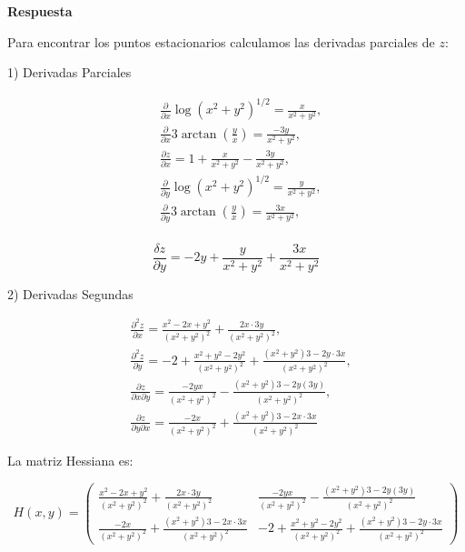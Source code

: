 \documentclass{report}
\begin{document}
\textbf{Respuesta}

Para encontrar los puntos estacionarios calculamos las derivadas parciales de $z$:

1) Derivadas Parciales

\[
\begin{aligned}
& \frac{\partial}{\partial x} \log \left(x^{2}+y^{2}\right)^{1 / 2}=\frac{x}{x^{2}+y^{2}}, \\
& \frac{\partial}{\partial x} 3\arctan\left(\frac{y}{x}\right)=\frac{-3 y}{x^{2}+y^{2}}, \\
& \frac{\partial z}{\partial x}=1+\frac{x}{x^{2}+y^{2}}-\frac{3 y}{x^{2}+y^{2}}, \\
& \frac{\partial}{\partial y} \log \left(x^{2}+y^{2}\right)^{1 / 2}=\frac{y}{x^{2}+y^{2}}, \\
& \frac{\partial}{\partial y} 3\arctan\left(\frac{y}{x}\right)=\frac{3 x}{x^{2}+y^{2}}, \\
\end{aligned}
\]

\[
\frac{\delta z}{\partial y}=-2 y+\frac{y}{x^{2}+y^{2}}+\frac{3 x}{x^{2}+y^{2}}
\]

2) Derivadas Segundas

\[
\begin{aligned}
& \frac{\partial^{2} z}{\partial x}=\frac{x^{2}-2 x+y^{2}}{\left(x^{2}+y^{2}\right)^{2}}+\frac{2 x \cdot 3 y}{\left(x^{2}+y^{2}\right)^{2}}, \\
& \frac{\partial^{2} z}{\partial y}=-2+\frac{x^{2}+y^{2}-2 y^{2}}{\left(x^{2}+y^{2}\right)^{2}}+\frac{(x^{2}+y^{2})3-2 y \cdot 3 x}{\left(x^{2}+y^{2}\right)^{2}}, \\
& \frac{\partial z}{\partial x \partial y}=\frac{-2 y x}{\left(x^{2}+y^{2}\right)^{2}}-\frac{(x^{2}+y^{2})3-2 y(3 y)}{\left(x^{2}+y^{2}\right)^{2}}, \\
& \frac{\partial z}{\partial y \partial x}=\frac{-2 x}{\left(x^{2}+y^{2}\right)^{2}}+\frac{(x^{2}+y^{2})3-2 x \cdot 3 x}{\left(x^{2}+y^{2}\right)^{2}}
\end{aligned}
\]

La matriz Hessiana es:

\[
H(x,y) = 
\begin{pmatrix}
\frac{x^2 - 2x + y^2}{(x^2 + y^2)^2} + \frac{2x \cdot 3y}{(x^2 + y^2)^2} & \frac{-2yx}{(x^2 + y^2)^2} - \frac{(x^2 + y^2)3 - 2y(3y)}{(x^2 + y^2)^2} \\
\frac{-2x}{(x^2 + y^2)^2} + \frac{(x^2 + y^2)3 - 2x \cdot 3x}{(x^2 + y^2)^2} & -2 + \frac{x^2 + y^2 - 2y^2}{(x^2 + y^2)^2} + \frac{(x^2 + y^2)3 - 2y \cdot 3x}{(x^2 + y^2)^2}
\end{pmatrix}
\]
\end{document}
